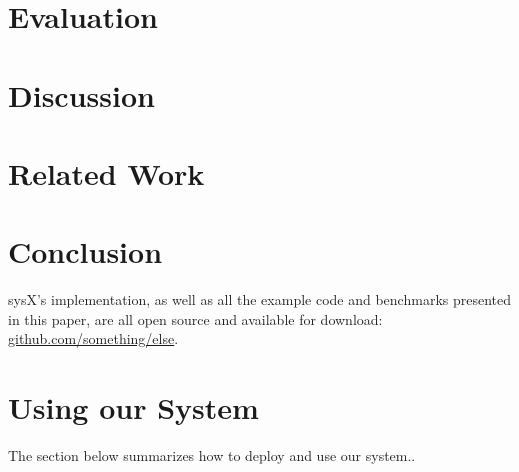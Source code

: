 \documentclass[sigplan, review, screen, 10pt]{acmart}
\begin{document}
\section{Evaluation}
\label{eval}

\section{Discussion}
\label{discussion}

\section{Related Work}
\label{related}

\section{Conclusion}
\label{conclusion}

sysX's implementation, as well as all the example code and benchmarks presented in this paper, are all open source and available for download:
\href{https://github.com/something/else}{github.com/something/else}.

\begin{acks}
\end{acks}

{\small

}

\appendix

\section{Using our System}
\label{using-apx}

The section below summarizes how to deploy and use our system..
\end{document}
